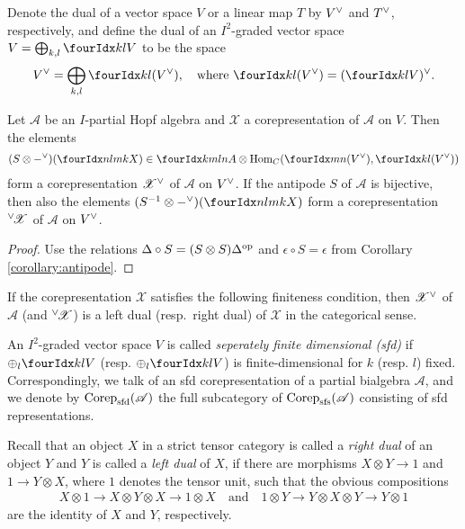  Denote the dual of a vector space $V$ or a linear map $T$ by
$V^{\vee}$ and  $T^{\vee}$, respectively, and define the dual
of an $I^{2}$-graded vector space $V=\bigoplus_{k,l} \Gru{V}{k}{l}$ to
be the space
\begin{align*}
  \dual{V}=\bigoplus_{k,l} \Gru{(\dual{V})}{k}{l}, \quad \text{where }
\Gru{(\dual{V})}{k}{l} = \dual{(\Gru{V}{k}{l})}.
\end{align*}
\begin{Lem}
   Let $\mathscr{A}$ be an $I$-partial Hopf algebra and $\mathscr{X}$
   a corepresentation of $\mathscr{A}$ on $V$. Then the elements
   \begin{align*}
     (S \otimes \dual{-})(\Gr{X}{n}{m}{l}{k}) \in \Gr{A}{k}{l}{m}{n}
     \otimes \Hom_{C}(\Gru{(\dual{V})}{m}{n},\Gru{(\dual{V})}{k}{l})
   \end{align*} 
   form a corepresentation $\mathscr{X}^{\vee}$ of $\mathscr{A}$ on
   $V^{\vee}$. If the antipode $S$ of $\mathscr{A}$ is bijective, then also
   the elements $(S^{-1} \otimes \dual{-})(\Gr{X}{n}{m}{l}{k})$ form a
   corepresentation ${^{\vee}\!\mathscr{X}}$ of $\mathscr{A}$ on
   $V^{\vee}$.
  \end{Lem}
  \begin{proof}
    Use the relations $\Delta \circ S = (S \otimes
    S)\Delta^{\operatorname{\mathrm{op}}}$ and $\epsilon \circ S = \epsilon$ from Corollary \ref{corollary:antipode}.
  \end{proof}
If  the corepresentation $\mathscr{X}$ satisfies the following finiteness
  condition, then  $\mathscr{X}^{\vee}$ of $\mathscr{A}$ (and
  ${^{\vee}\!\mathscr{X}}$) is a left dual (resp.\ right dual) of
  $\mathscr{X}$ in the categorical sense.
\begin{Def} An $I^2$-graded vector space $V$ is called
  \emph{seperately finite dimensional (sfd)} if $\oplus_l
  \Gru{V}{k}{l}$ (resp. $\oplus_l \Gru{V}{k}{l}$) is
  finite-dimensional for $k$ (resp. $l$) fixed. Correspondingly, we
  talk of an sfd corepresentation of a partial bialgebra
  $\mathscr{A}$, and we denote by $\mathrm{Corep}_{\mathrm{sfd}}(\mathscr{A})$ the
  full subcategory of $\mathrm{Corep}_{\mathrm{sfs}}(\mathscr{A})$ consisting of sfd
  representations.
\end{Def} 
Recall that an object $X$ in a strict tensor category is called a
\emph{right dual} of an object $Y$ and $Y$ is called a \emph{left
  dual} of $X$, if there are morphisms $X \otimes Y \to 1$ and $1 \to
Y \otimes X$, where $1$ denotes the tensor unit, such
that the obvious compositions
  \begin{gather*}
 X \otimes 1 \to X\otimes Y\otimes X
  \to 1 \otimes X  \quad\text{and} \quad
     1 \otimes Y \to Y \otimes X \otimes Y \to Y
    \otimes 1 
  \end{gather*}
  are the identity of $X$ and $Y$,
  respectively.  

